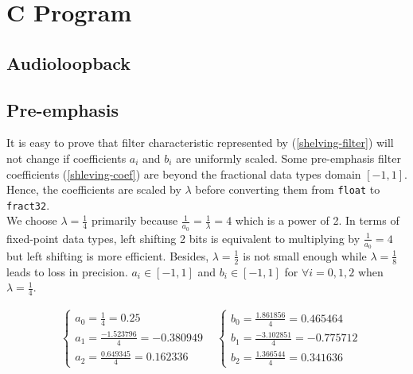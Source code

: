 
\section{C Program}
\label{section:c_program}

\subsection{Audioloopback}


\subsection{Pre-emphasis}

It is easy to prove that filter characteristic represented by (\ref{shelving-filter}) will not change if coefficients $a_i$ and $b_i$ are uniformly scaled. Some pre-emphasis filter coefficients (\ref{shleving-coef}) are beyond the fractional data types domain $[-1, 1]$. Hence, the coefficients are scaled by $\lambda$ before converting them from \texttt{float} to \texttt{fract32}.\\

We choose $\lambda = \frac{1}{4}$ primarily because $\frac{1}{a_0} = \frac{1}{\lambda} = 4$ which is a power of 2. In terms of fixed-point data types, left shifting 2 bits is equivalent to multiplying by $\frac{1}{a_0} = 4$ but left shifting is more efficient. Besides, $\lambda = \frac{1}{2}$ is not small enough while $\lambda = \frac{1}{8}$ leads to loss in precision. $a_i \in [-1, 1]$ and $b_i \in [-1, 1]$ for $\forall i = 0, 1, 2$ when $\lambda = \frac{1}{4}$.

\begin{align*}
&\begin{cases}
a_0 = \frac{1}{4} = 0.25\\
a_1 = \frac{-1.523796}{4} = -0.380949\\
a_2 = \frac{0.649345}{4} = 0.162336
\end{cases}
&\begin{cases}
b_0 = \frac{1.861856}{4} = 0.465464\\
b_1 = \frac{-3.102851}{4} = -0.775712\\
b_2 = \frac{1.366544}{4} = 0.341636
\end{cases}
\end{align*}

